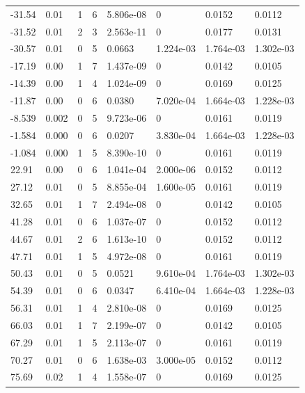 \documentclass[preview]{standalone}
\begin{document}
{{\begin{tabular}{L{1.2cm}C{1.2cm} C{0.3cm}C{0.5cm} C{1.4cm}C{1.4cm} C{1.4cm}C{1.4cm}}
  -31.54  &  0.01  & 1     &  6 &  5.806e-08  & 0  & 0.0152 &  0.0112   \\ 
  -31.52  &  0.01  & 2     &  3 &  2.563e-11  & 0  & 0.0177 &  0.0131   \\ 
  -30.57  &  0.01  & 0     &  5 &  0.0663  & 1.224e-03  & 1.764e-03 &  1.302e-03   \\ 
  -17.19  &  0.00  & 1     &  7 &  1.437e-09  & 0  & 0.0142 &  0.0105   \\ 
  -14.39  &  0.00  & 1     &  4 &  1.024e-09  & 0  & 0.0169 &  0.0125   \\ 
  -11.87  &  0.00  & 0     &  6 &  0.0380  & 7.020e-04  & 1.664e-03 &  1.228e-03   \\ 
  -8.539  &  0.002  & 0     &  5 &  9.723e-06  & 0  & 0.0161 &  0.0119   \\ 
  -1.584  &  0.000  & 0     &  6 &  0.0207  & 3.830e-04  & 1.664e-03 &  1.228e-03   \\ 
  -1.084  &  0.000  & 1     &  5 &  8.390e-10  & 0  & 0.0161 &  0.0119   \\ 
  22.91  &  0.00  & 0     &  6 &  1.041e-04  & 2.000e-06  & 0.0152 &  0.0112   \\ 
  27.12  &  0.01  & 0     &  5 &  8.855e-04  & 1.600e-05  & 0.0161 &  0.0119   \\ 
  32.65  &  0.01  & 1     &  7 &  2.494e-08  & 0  & 0.0142 &  0.0105   \\ 
  41.28  &  0.01  & 0     &  6 &  1.037e-07  & 0  & 0.0152 &  0.0112   \\ 
  44.67  &  0.01  & 2     &  6 &  1.613e-10  & 0  & 0.0152 &  0.0112   \\ 
  47.71  &  0.01  & 1     &  5 &  4.972e-08  & 0  & 0.0161 &  0.0119   \\ 
  50.43  &  0.01  & 0     &  5 &  0.0521  & 9.610e-04  & 1.764e-03 &  1.302e-03   \\ 
  54.39  &  0.01  & 0     &  6 &  0.0347  & 6.410e-04  & 1.664e-03 &  1.228e-03   \\ 
  56.31  &  0.01  & 1     &  4 &  2.810e-08  & 0  & 0.0169 &  0.0125   \\ 
  66.03  &  0.01  & 1     &  7 &  2.199e-07  & 0  & 0.0142 &  0.0105   \\ 
  67.29  &  0.01  & 1     &  5 &  2.113e-07  & 0  & 0.0161 &  0.0119   \\ 
  70.27  &  0.01  & 0     &  6 &  1.638e-03  & 3.000e-05  & 0.0152 &  0.0112   \\ 
  75.69  &  0.02  & 1     &  4 &  1.558e-07  & 0  & 0.0169 &  0.0125   \\ 

\end{tabular}}}
\end{document}
